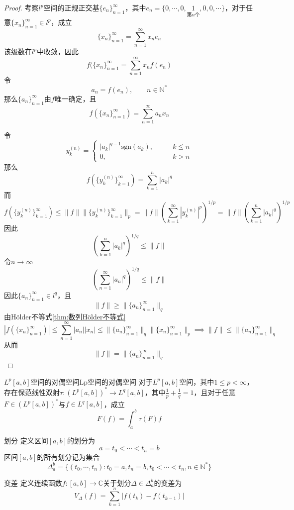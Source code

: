 \documentclass[lang = cn, scheme = chinese, thmcnt = section]{elegantbook}
\newcommand{\N}{\mathbb{N}}            %
\newcommand{\C}{\mathbb{C}}  		   %
\begin{document}
\begin{proof}
	考察$l^p$空间的正规正交基$\{e_n\}_{n=1}^{\infty}$，其中$e_n=\{0,\cdots,0,\underset{\text{第}n\text{个}}{1},0,0,\cdots\}$，对于任意$\{x_n\}_{n=1}^{\infty}\in l^p$，成立
	$$
	\{x_n\}_{n=1}^{\infty}=\sum_{n=1}^{\infty}x_ne_n
	$$
	该级数在$l^p$中收敛，因此
	$$
	f(\{x_n\}_{n=1}^{\infty}=\sum_{n=1}^{\infty}x_nf(e_n)
	$$
	令
	$$
	a_n=f(e_n),\qquad n\in\N^*
	$$
	那么$\{a_n\}_{n=1}^{\infty}$由$f$唯一确定，且
	$$
	f(\{x_n\}_{n=1}^{\infty})=\sum_{n=1}^{\infty}a_nx_n
	$$
	
	令
	$$
	y_{k}^{(n)}=\begin{cases}
		|a_k|^{q-1}\text{sgn}(a_k),\qquad & k\le n\\
		0,\qquad & k>n
	\end{cases}
	$$
	那么
	$$
	f(\{y_k^{(n)}\}_{k=1}^{\infty})=\sum_{k=1}^{n}|a_k|^q
	$$
	而
	$$
	f(\{y_k^{(n)}\}_{k=1}^{\infty})
	\le \|f\|\| \{y_k^{(n)}\}_{k=1}^{\infty} \|_p
	= \|f\|\left(\sum_{k=1}^{\infty}|y_k^{(n)}|^p\right)^{1/p}
	= \|f\|\left(\sum_{k=1}^{n}|a_k|^q\right)^{1/p}
	$$
	因此
	$$
	\left(\sum_{k=1}^{n}|a_k|^q\right)^{1/q}\le \|f\|
	$$
	令$n\to\infty$
	$$
	\left(\sum_{n=1}^{\infty}|a_n|^q\right)^{1/q}\le \|f\|
	$$
	因此$\{a_n\}_{n=1}^{\infty}\in l^q$，且
	$$
	\|f\|\ge \| \{a_n\}_{n=1}^{\infty} \|_q
	$$
	由Hölder不等式\ref{thm:数列Hölder不等式}
	$$
	|f(\{x_n\}_{n=1}^{\infty})|
	\le \sum_{n=1}^{\infty}|a_n||x_n|
	\le \|\{a_n\}_{n=1}^{\infty}\|_q \|\{x_n\}_{n=1}^{\infty}\|_p \implies
	\|f\|\le \| \{a_n\}_{n=1}^{\infty} \|_q
	$$
	从而
	$$
	\|f\|=\| \{a_n\}_{n=1}^{\infty} \|_q
	$$
\end{proof}

\begin{theorem}{$L^p[a,b]$空间的对偶空间}{Lp空间的对偶空间}
	对于$L^p[a,b]$空间，其中$1\le p<\infty$，存在保范线性双射$\tau:(L^p[a,b])^*\to L^q[a,b]$，其中$\frac{1}{p}+\frac{1}{q}=1$，且对于任意$F\in (L^p[a,b])^*$与$f\in L^q[a,b]$，成立
	$$
	F(f)=\int_a^b \tau(F)f
	$$
\end{theorem}

\begin{definition}{划分}
	定义区间$[a,b]$的划分为
	$$
	a=t_0<\cdots<t_n=b
	$$
	区间$[a,b]$的所有划分记为集合
	$$
	\Delta_a^b=\{ (t_0,\cdots,t_n):t_0=a,t_n=b,t_0<\cdots<t_n,n\in\N^* \}
	$$
\end{definition}

\begin{definition}{变差}
	定义连续函数$f:[a,b]\to \C$关于划分$\Delta\in\Delta_a^b$的变差为
	$$
	V_{\Delta}(f)=\sum_{k=1}^{n}{|f(t_k)-f(t_{k-1})|}
	$$
\end{definition}
\end{document}
